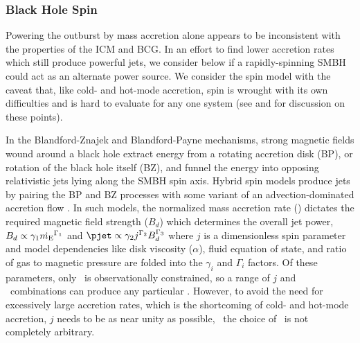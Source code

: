 \documentclass[iop]{emulateapj}
\begin{document}
\subsubsection{Black Hole Spin}

Powering the outburst by mass accretion alone appears to be
inconsistent with the properties of the ICM and BCG. In an effort to
find lower accretion rates which still produce powerful jets, we
consider below if a rapidly-spinning SMBH could act as an alternate
power source. We consider the spin model with the caveat that, like
cold- and hot-mode accretion, spin is wrought with its own
difficulties and is hard to evaluate for any one system (see
\citealt{msspin} and \citealt{minaspin} for discussion on these
points).

In the Blandford-Znajek \citep[BZ;][]{bz} and Blandford-Payne
\citep[BP;][]{bp} mechanisms, strong magnetic fields wound around a
black hole extract energy from a rotating accretion disk (BP), or
rotation of the black hole itself (BZ), and funnel the energy into
opposing relativistic jets lying along the SMBH spin axis. Hybrid spin
models \citep[\eg][]{1999ApJ...522..753M, 2001ApJ...548L...9M,
  2006ApJ...651.1023R, 2007MNRAS.377.1652N, 2009MNRAS.397.1302B,
  gesspin} produce jets by pairing the BP and BZ processes with some
variant of an advection-dominated accretion flow \citep{adaf}. In such
models, the normalized mass accretion rate (\dme) dictates the
required magnetic field strength ($B_d$) which determines the overall
jet power, \ie\ $B_d \propto \gamma_1 \dot{m_{\rm{E}}}^{\Gamma_1}$ and $\pjet
\propto \gamma_2 j^{\Gamma_2} B_d^{\Gamma_3}$ where $j$ is a
dimensionless spin parameter and model dependencies like disk
viscosity ($\alpha$), fluid equation of state, and ratio of gas to
magnetic pressure are folded into the $\gamma_i$ and $\Gamma_i$
factors. Of these parameters, only \pjet\ is observationally
constrained, so a range of $j$ and \dme\ combinations can produce any
particular \pjet. However, to avoid the need for excessively large
accretion rates, which is the shortcoming of cold- and hot-mode
accretion, $j$ needs to be as near unity as possible, \ie\ the choice
of \dme\ is not completely arbitrary.
\end{document}
